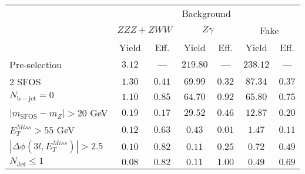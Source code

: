 \begin{tabular}{l||c|c||c|c||c|c}
\hline
 &       \multicolumn{6}{c}{Background} \\
 & \multicolumn{2}{c||}{$ZZZ+ZWW$} & \multicolumn{2}{c||}{$Z\gamma$} & \multicolumn{2}{c}{Fake} \\ 
 & Yield & Eff. & Yield & Eff. & Yield & Eff. \\
\hline\hline
Pre-selection & $3.12$ & --- &  $219.80$ & --- &  $238.12$ & ---  \\ 
\hline
2 SFOS &  $1.30$ &  $0.41$ &  $69.99$ &  $0.32$ &  $87.34$ &  $0.37$ \\ 
\hline
$N_{\mathrm{b-jet}}=0$ &  $1.10$ &  $0.85$ &  $64.70$ &  $0.92$ &  $65.80$ &  $0.75$ \\ 
\hline
$| m_{\mathrm{SFOS}} - m_Z | >  20$ GeV &  $0.19$ &  $0.17$ &  $29.52$ &  $0.46$ &  $12.87$ &  $0.20$ \\ 
\hline
$E_{T}^{Miss} > 55$ GeV &  $0.12$ &  $0.63$ &  $0.43$ &  $0.01$ &  $1.47$ &  $0.11$ \\ 
\hline
$|\Delta\phi(3l,E_{T}^{Miss})| > 2.5$ &  $0.10$ &  $0.82$ &  $0.11$ &  $0.25$ &  $0.72$ &  $0.49$ \\ 
\hline
$N_{\mathrm{Jet}} \leq 1$ &  $0.08$ &  $0.82$ &  $0.11$ &  $1.00$ &  $0.49$ &  $0.69$ \\ 
\hline
\end{tabular}

